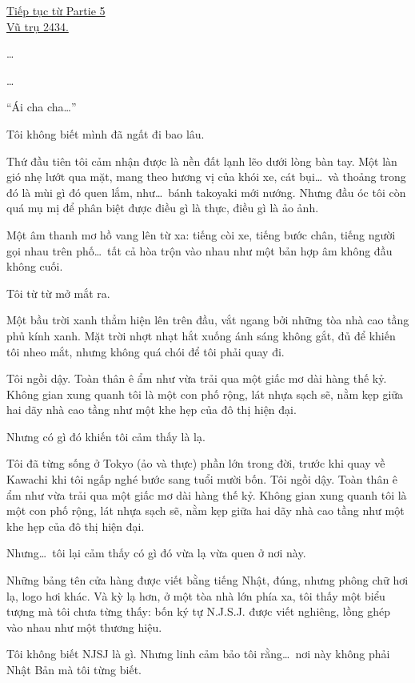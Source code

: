 \documentclass[../main.tex]{subfiles}
\begin{document}
\begin{center}
  \uline{Tiếp tục từ {\sen Partie 5}\\Vũ trụ 2434.}
\end{center}

\dots

\dots

``Ái cha cha\dots''

Tôi không biết mình đã ngất đi bao lâu.

Thứ đầu tiên tôi cảm nhận được là nền đất lạnh lẽo dưới lòng bàn tay. Một làn gió nhẹ lướt qua mặt, mang theo hương vị của khói xe, cát bụi\dots\ và thoảng trong đó là mùi gì đó quen lắm, như\dots\ bánh takoyaki mới nướng. Nhưng đầu óc tôi còn quá mụ mị để phân biệt được điều gì là thực, điều gì là ảo ảnh.

Một âm thanh mơ hồ vang lên từ xa: tiếng còi xe, tiếng bước chân, tiếng người gọi nhau trên phố\dots\ tất cả hòa trộn vào nhau như một bản hợp âm không đầu không cuối.

Tôi từ từ mở mắt ra.

Một bầu trời xanh thẳm hiện lên trên đầu, vắt ngang bởi những tòa nhà cao tầng phủ kính xanh. Mặt trời nhợt nhạt hắt xuống ánh sáng không gắt, đủ để khiến tôi nheo mắt, nhưng không quá chói để tôi phải quay đi.

Tôi ngồi dậy. Toàn thân ê ẩm như vừa trải qua một giấc mơ dài hàng thế kỷ. Không gian xung quanh tôi là một con phố rộng, lát nhựa sạch sẽ, nằm kẹp giữa hai dãy nhà cao tầng như một khe hẹp của đô thị hiện đại.

Nhưng có gì đó khiến tôi cảm thấy là lạ.

Tôi đã từng sống ở Tokyo (ảo và thực) phần lớn trong đời, trước khi quay về Kawachi khi tôi ngấp nghé bước sang tuổi mười bốn. Tôi ngồi dậy. Toàn thân ê ẩm như vừa trải qua một giấc mơ dài hàng thế kỷ. Không gian xung quanh tôi là một con phố rộng, lát nhựa sạch sẽ, nằm kẹp giữa hai dãy nhà cao tầng như một khe hẹp của đô thị hiện đại.

Nhưng\dots\ tôi lại cảm thấy có gì đó vừa lạ vừa quen ở nơi này.

Những bảng tên cửa hàng được viết bằng tiếng Nhật, đúng, nhưng phông chữ hơi lạ, logo hơi khác. Và kỳ lạ hơn, ở một tòa nhà lớn phía xa, tôi thấy một biểu tượng mà tôi chưa từng thấy: bốn ký tự N.J.S.J. được viết nghiêng, lồng ghép vào nhau như một thương hiệu.

Tôi không biết NJSJ là gì. Nhưng linh cảm bảo tôi rằng\dots\ nơi này không phải Nhật Bản mà tôi từng biết.
\end{document}
